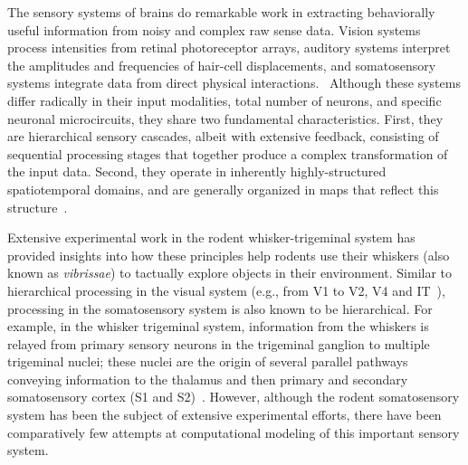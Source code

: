 The sensory systems of brains do remarkable work in extracting behaviorally useful information from noisy and complex raw sense data. 
Vision systems process intensities from retinal photoreceptor arrays, auditory systems interpret the amplitudes and frequencies of hair-cell displacements, and somatosensory systems integrate data from direct physical interactions.~\cite{purves2001neuroscience} 
Although these systems differ radically in their input modalities, total number of neurons, and specific neuronal microcircuits, they share two fundamental characteristics. 
First, they are hierarchical sensory cascades, albeit with extensive feedback, consisting of sequential processing stages that together produce a complex transformation of the input data.  
Second, they operate in inherently highly-structured spatiotemporal domains, and are generally organized in maps that reflect this structure~\cite{felleman1991distributed}.

Extensive experimental work in the rodent whisker-trigeminal system has provided insights into how these principles help rodents use their whiskers (also known as \emph{vibrissae}) to tactually explore objects in their environment.  
Similar to hierarchical processing in the visual system (e.g., from V1 to V2, V4 and IT~\cite{felleman1991distributed, Goodale1992}), processing in the somatosensory system is also known to be hierarchical\cite{Pons1987, Inui2004, Iwamura1998}.  
For example, in the whisker trigeminal system, information from the whiskers is relayed from primary sensory neurons in the trigeminal ganglion to multiple trigeminal nuclei; these nuclei are the origin of several parallel pathways conveying information to the thalamus and then primary and secondary somatosensory cortex (S1 and S2)~\cite{bosman2011anatomical}.  
However, although the rodent somatosensory system has been the subject of extensive experimental efforts\cite{armstrong1992flow, petersen2003spatiotemporal, kerr2007spatial, von2007neuronal}, there have been comparatively few attempts at computational modeling of this important sensory system. 

